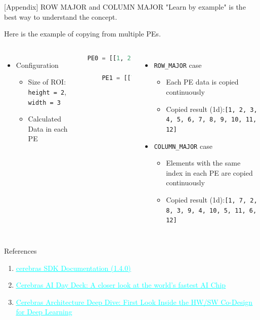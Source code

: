 \documentclass[dvipdfmx, 11pt, aspectratio=169]{beamer}   %
\newcommand{\ulhref}[2]{\href{#1}{\textcolor{cyan}{\uline{#2}}}}
\begin{document}
\begin{frame}[fragile]{[Appendix] ROW MAJOR and COLUMN MAJOR}
"Learn by example" is the best way to understand the concept.

Here is the example of copying from multiple PEs.
\begin{columns}
\begin{itemize}
    \item Configuration
    \begin{itemize}
        \item Size of ROI: \lstinline|height = 2|, \lstinline|width = 3|
        \item Calculated Data in each PE 
    \end{itemize}
\end{itemize}
\begin{lstlisting}[language=python]
    PE0 = [[1, 2, 3],
            [4, 5, 6]]
    PE1 = [[7, 8, 9],
            [10, 11, 12]]
\end{lstlisting}
\begin{itemize}
    \item \lstinline|ROW_MAJOR| case
    \begin{itemize}
        \item Each PE data is copied continuously
        \item Copied result (1d):\lstinline|[1, 2, 3, 4, 5, 6, 7, 8, 9, 10, 11, 12]|
    \end{itemize}
    \item \lstinline|COLUMN_MAJOR| case
    \begin{itemize}
        \item Elements with the same index in each PE are copied continuously
        \item Copied result (1d):\lstinline|[1, 7, 2, 8, 3, 9, 4, 10, 5, 11, 6, 12]|
    \end{itemize}
\end{itemize}
\end{columns}
\end{frame}
\begin{frame}[fragile]{References}
  \begin{enumerate}\footnotesize
    \item \ulhref{https://sdk.cerebras.net/computing-with-cerebras}{cerebras SDK Documentation (1.4.0)}
    \item \ulhref{https://www.slideshare.net/slideshow/cerebras-ai-day-deck-a-closer-look-at-the-worlds-fastest-ai-chip/266911791}{Cerebras AI Day Deck: A closer look at the world's fastest AI Chip}
    \item \ulhref{https://hc34.hotchips.org/assets/program/conference/day2/Machine\%20Learning/HC2022_Cerebras_Final_v02.pdf}{Cerebras Architecture Deep Dive: First Look Inside the HW/SW Co-Design for Deep Learning}
  \end{enumerate}
\end{frame}
\end{document}
